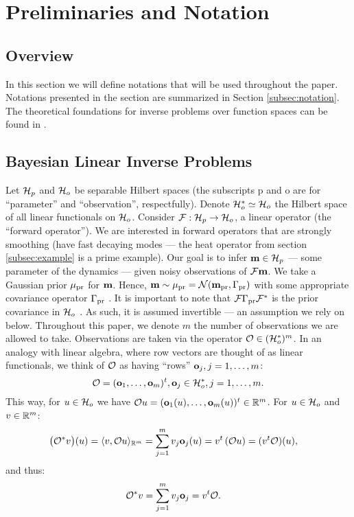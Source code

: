 \section{Preliminaries and Notation}\label{section:prelim}

\subsection{Overview}
In this section we will define notations that will be used throughout
the paper. Notations presented in the section are summarized in
Section \ref{subsec:notation}. The theoretical foundations for inverse
problems over function spaces can be found in \cite{Stuart10}.

\subsection{Bayesian Linear Inverse Problems}\label{subsec:abstract OED}
Let $\mathcal{H}_p$ and $\mathcal{H}_o$ be separable Hilbert spaces (the subscripts p
and o are for ``parameter'' and ``observation'', respectfully). Denote
$\mathcal{H}_o^* \simeq \mathcal{H}_o$ the Hilbert space of all linear functionals on
$\mathcal{H}_o$. Consider $\mathcal{F}: \mathcal{H}_p \to \mathcal{H}_o$, a linear operator (the
``forward operator''). We are interested in forward operators that are
strongly smoothing (have fast decaying modes --- the heat operator
from section \ref{subsec:example} is a prime example). Our goal is to
infer $\mathbf{m} \in \mathcal{H}_p$ --- some parameter of the dynamics --- given
noisy observations of $\mathcal{F} \mathbf{m}$. We take a Gaussian prior $\mu_{\textup{pr}}$
for $\mathbf{m}$. Hence, $\mathbf{m} \sim \mu_{\textup{pr}} = \mathcal{N}(\mathbf{m}_{\textup{pr}} ,\Gamma_{\textup{pr}})$ with
some appropriate covariance operator $\Gamma_{\textup{pr}}$ \cite{Stuart10}. It is
important to note that $\mathcal{F} \Gamma_{\textup{pr}} \mathcal{F}^*$ is the prior covariance in
$\mathcal{H}_o$ \cite{Stuart10}. As such, it is assumed invertible --- an
assumption we rely on below. Throughout this paper, we denote $m$ the
number of observations we are allowed to take. Observations are taken
via the operator $\mathcal{O} \in ( \mathcal{H}_o^* )^m$. In an analogy with linear
algebra, where row vectors are thought of as linear functionals, we
think of $\mathcal{O}$ as having ``rows'' $\mathbf{o}_j, j=1,\dots,m$:
\begin{equation}\label{eq:O}
  \obs = (\meas_1,\dots, \meas_m)^t, \meas_j \in \hilo^*, j = 1,\dots,m.
\end{equation}
This way, for $u \in \mathcal{H}_o$ we have $\mathcal{O} u = (\mathbf{o}_1(u), \dots,
\mathbf{o}_m(u) )^t \in \mathbb{R}^m$.
For $u \in \mathcal{H}_o$ and $v\in \mathbb{R}^m$:
\begin{align*}
  \big (\obs^*v \big ) (u) &= \langle v, \obs u \rangle_{\R^m} = \sum_{j=1}^m  v_j \meas_j(u)
  = v^t \left ( \obs u \right ) = (v^t \obs) (u),
\end{align*}
and thus:
\begin{align}\label{eq:obs*}
  \obs^*v &= \sum_{j=1}^m v_j \meas_j = v^t \obs.
\end{align}

